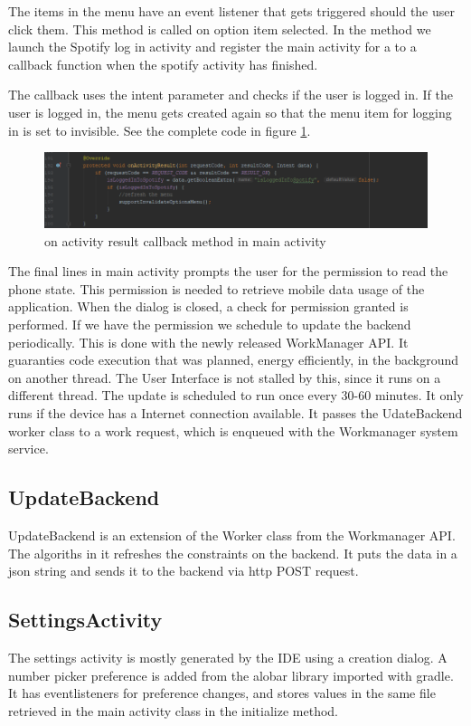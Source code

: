 The items in the menu have an event listener that gets triggered should the user click them. This method is called on option item selected. In the method we launch the Spotify log in activity and register the main activity for a to a callback function when the spotify activity has finished.

The callback uses the intent parameter and checks if the user is logged in. If the user is logged in, the menu gets created again so that the menu item for logging in is set to invisible. See the complete code in figure \ref{fig:mainonactivityresult}.
\begin{figure}
	\centering
	\includegraphics[width=1\linewidth]{Figures/mainonactivityresult}
	\caption{on activity result callback method in main activity}
	\label{fig:mainonactivityresult}
\end{figure}

The final lines in main activity prompts the user for the permission to read the phone state. This permission is needed to retrieve mobile data usage of the application. When the dialog is closed, a check for permission granted is performed. If we have the permission we schedule to update the backend periodically. This is done with the newly released WorkManager API. It guaranties code execution that was planned, energy efficiently, in the background on another thread. The User Interface is not stalled by this, since it runs on a different thread. The update is scheduled to run once every 30-60 minutes. It only runs if the device has a Internet connection available. It passes the UdateBackend worker class to a work request, which is enqueued with the Workmanager system service.



\subsection{UpdateBackend \label{updatebackend}}
UpdateBackend is an extension of the Worker class from the Workmanager API. The algoriths in it refreshes the constraints on the backend. It puts the data in a json string and sends it to the backend via http POST request. 
\subsection{SettingsActivity \label{settingsactivity}}
The settings activity is mostly generated by the IDE using a creation dialog. A number picker preference is added from the alobar library imported with gradle. It has eventlisteners for preference changes, and stores values in the same file retrieved in the main activity class in the initialize method.
